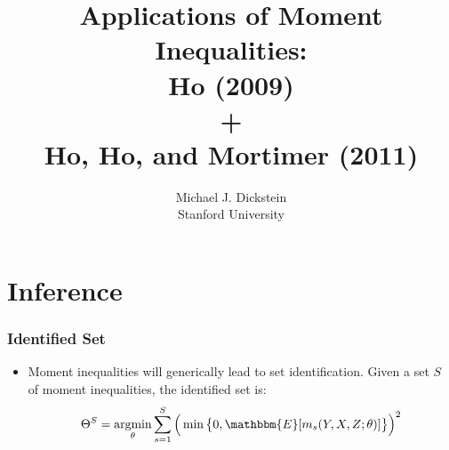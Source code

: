 \documentclass[notes=show]{beamer}
\begin{document}
\title[Moment Inequalities]{Applications of Moment Inequalities:\\ Ho (2009) \\ + \\ Ho, Ho, and Mortimer (2011)}
\author[MJ Dickstein]{Michael J. Dickstein \\
Stanford University}
\maketitle


\section{Inference}


\begin{frame}
\frametitle{Identified Set}

\begin{itemize}
\item Moment inequalities will generically lead to set identification. Given
a set $S$ of moment inequalities, the identified set is:  
\begin{equation*}
\Theta^{S}=\operatornamewithlimits{argmin}_{\theta}\sum_{s=1}^{S}\Big(\min%
\big\{0,\mathbbm{E}[m_{s}(Y,X,Z;\theta)]\big\}\Big)^{2}
\end{equation*}
\begin{figure}[h!]
\begin{center}
   
\end{center}
\end{figure}
\end{itemize}
\end{frame}
\end{document}

